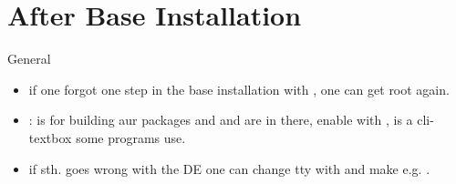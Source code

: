 
\section{After Base Installation}

\begin{frame}[fragile]{General}
  \begin{itemize}
    \item if one forgot one step in the base installation with , one can get root again.
    \item {\tiny{}}:  is for building aur packages and  and  are in there, enable  with ,  is a cli-textbox some programs use.
    \item if sth. goes wrong with the DE one can change tty with  and make e.g. .
  \end{itemize}
\end{frame}

